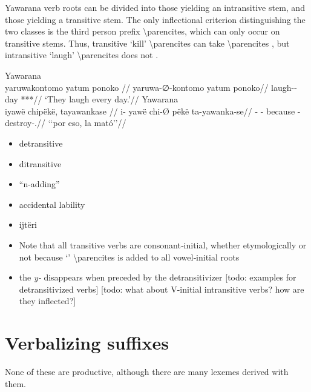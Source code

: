 \documentclass{memoir}
\begin{document}
Yawarana verb roots can be divided into those yielding an intransitive
stem, and those yielding a transitive stem. The only inflectional
criterion distinguishing the two classes is the third person prefix
 \textbackslash parencites, which can only occur on transitive
stems. Thus, transitive  `kill' \textbackslash parencites
can take  \textbackslash parencites ,
but intransitive  `laugh' \textbackslash parencites does not
.

\pex\label{}    \a Yawarana\\
    \label{convrisamaj-42}        \begingl
        \glpreamble yaruwakontomo yatum ponoko //
        \gla yaruwa-∅-kontomo yatum ponoko//
        \glb laugh-- day ***//
            \glft ‘They laugh every day.’//  
        \endgl 
    \a Yawarana\\
    \label{convfemgrme-217}        \begingl
        \glpreamble iyawë chipëkë, tayawankase //
        \gla i- yawë chi-Ø pëkë ta-yawanka-se//
        \glb {}-  - because -destroy-.//
            \glft ‘‘por eso, la mató’’//  
        \endgl 
\xe

\begin{itemize}
\item
  detransitive
\item
  ditransitive
\item
  ``n-adding''
\item
  accidental lability
\item
  ijtëri
\item
  Note that all transitive verbs are consonant‑initial, whether
  etymologically or not because  `'
  \textbackslash parencites is added to all vowel‑initial roots
\item
  the \emph{y‑} disappears when preceded by the detransitivizer {[}todo:
  examples for detransitivized verbs{]} {[}todo: what about V-initial
  intransitive verbs? how are they inflected?{]}
\end{itemize}

\section{\texorpdfstring{Verbalizing suffixes
\label{sec:vbz}}{Verbalizing suffixes }}

None of these are productive, although there are many lexemes derived
with them.
\end{document}
